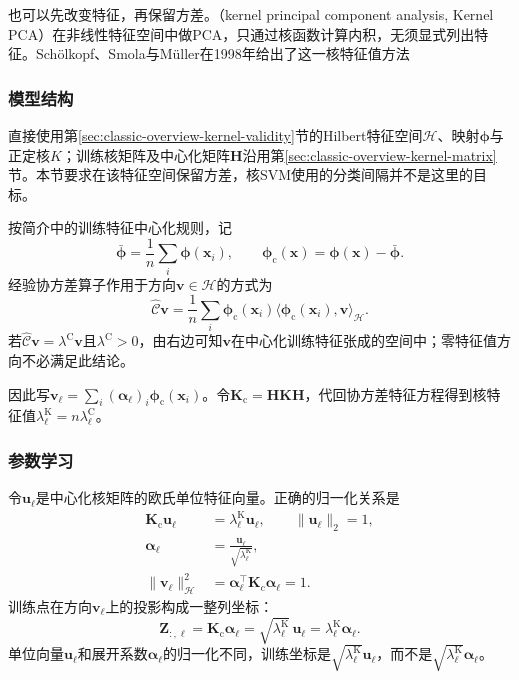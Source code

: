 也可以先改变特征，再保留方差。（kernel principal component analysis, Kernel PCA）在非线性特征空间中做PCA，只通过核函数计算内积，无须显式列出特征。Schölkopf、Smola与Müller在1998年给出了这一核特征值方法

\subsubsection{模型结构}

直接使用第\ref{sec:classic-overview-kernel-validity}节的Hilbert特征空间$\mathcal{H}$、映射$\bm{\phi}$与正定核$K$；训练核矩阵及中心化矩阵$\bm{H}$沿用第\ref{sec:classic-overview-kernel-matrix}节。本节要求在该特征空间保留方差，核SVM使用的分类间隔并不是这里的目标。

按简介中的训练特征中心化规则，记
\[
  \bar{\bm{\phi}}=\frac1n\sum_i\bm{\phi}(\bm{x}_i),
  \qquad
  \bm{\phi}_{\mathrm{c}}(\bm{x})=\bm{\phi}(\bm{x})-\bar{\bm{\phi}}.
\]
经验协方差算子作用于方向$\bm{v}\in\mathcal{H}$的方式为
\begin{equation}
  \label{eq:dim-kpca-covariance}
  \widehat{\mathcal{C}}\bm{v}
  =\frac1n\sum_i
    \bm{\phi}_{\mathrm{c}}(\bm{x}_i)
    \langle\bm{\phi}_{\mathrm{c}}(\bm{x}_i),\bm{v}\rangle_{\mathcal{H}}.
\end{equation}
若$\widehat{\mathcal{C}}\bm{v}=\lambda^{\mathrm{C}}\bm{v}$且$\lambda^{\mathrm{C}}>0$，由右边可知$\bm{v}$在中心化训练特征张成的空间中；零特征值方向不必满足此结论。

因此写$\bm{v}_\ell=\sum_i(\bm{\alpha}_\ell)_i\bm{\phi}_{\mathrm{c}}(\bm{x}_i)$。令$\bm{K}_{\mathrm{c}}=\bm{H}\bm{K}\bm{H}$，代回协方差特征方程得到核特征值$\lambda_\ell^{\mathrm{K}}=n\lambda_\ell^{\mathrm{C}}$。

\subsubsection{参数学习}

令$\bm{u}_\ell$是中心化核矩阵的欧氏单位特征向量。正确的归一化关系是
\begin{equation}
  \label{eq:dim-kpca-normalization}
  \begin{aligned}
    \bm{K}_{\mathrm{c}}\bm{u}_\ell
      &=\lambda_\ell^{\mathrm{K}}\bm{u}_\ell,
      \qquad\lVert\bm{u}_\ell\rVert_2=1,\\
    \bm{\alpha}_\ell
      &=\frac{\bm{u}_\ell}{\sqrt{\lambda_\ell^{\mathrm{K}}}},\\
    \lVert\bm{v}_\ell\rVert_{\mathcal{H}}^2
      &=\bm{\alpha}_\ell^{\top}\bm{K}_{\mathrm{c}}\bm{\alpha}_\ell=1.
  \end{aligned}
\end{equation}
训练点在方向$\bm{v}_\ell$上的投影构成一整列坐标：
\begin{equation}
  \label{eq:dim-kpca-training}
  \bm{Z}_{:,\ell}
  =\bm{K}_{\mathrm{c}}\bm{\alpha}_\ell
  =\sqrt{\lambda_\ell^{\mathrm{K}}}\,\bm{u}_\ell
  =\lambda_\ell^{\mathrm{K}}\bm{\alpha}_\ell.
\end{equation}
单位向量$\bm{u}_\ell$和展开系数$\bm{\alpha}_\ell$的归一化不同，训练坐标是$\sqrt{\lambda_\ell^{\mathrm{K}}}\bm{u}_\ell$，而不是$\sqrt{\lambda_\ell^{\mathrm{K}}}\bm{\alpha}_\ell$。

